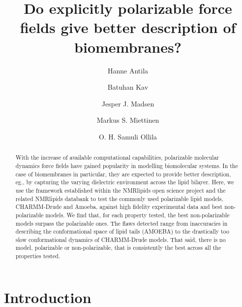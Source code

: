 \documentclass[journal=jacsat,manuscript=article,layout=singlecolumn]{achemso}
\author{Hanne Antila}
\author{Batuhan Kav}
\affiliation{Forschungszentrum Juelich, Germany}
\author{Jesper J. Madsen}
\author{Markus S. Miettinen}
\author{O. H. Samuli Ollila}
\title{Do explicitly polarizable force fields give better description of biomembranes?}
\begin{document}


\begin{abstract}
With the increase of available computational capabilities, polarizable molecular dynamics force fields have gained popularity in modelling biomolecular systems. In the case of biomembranes in particular, they are expected to provide better description, eg., by capturing the varying dielectric environment across the lipid bilayer. Here, we use the framework established within the NMRlipids open science project and the related NMRlipids databank to test the commonly used polarizable lipid models, CHARMM-Drude and Amoeba, against high fidelity experimental data and best non-polarizable models. We find that, for each property tested, the best non-polarizable models surpass the polarizable ones. The flaws detected range from inaccuracies in describing the conformational space of lipid tails (AMOEBA) to the drastically too slow conformational dynamics of CHARMM-Drude models. That said, there is no model, polarizable or non-polarizable, that is consistently the best across all the properties tested. 
	
	
\end{abstract}

\section{Introduction}
\end{document}
